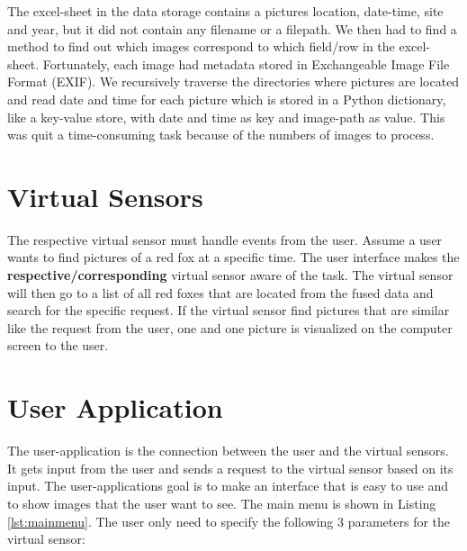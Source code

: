 \documentclass[USenglish]{uit-thesis}
\begin{document}
The excel-sheet in the data storage contains a pictures location, date-time, site and year, but it did not contain any filename or a filepath. We then had to find a method to find out which images correspond to which field/row in the excel-sheet. Fortunately, each image had metadata stored in Exchangeable Image File Format (EXIF). We recursively traverse the directories where pictures are located and read date and time for each picture which is stored in a Python dictionary, like a key-value store, with date and time as key and image-path as value. This was quit a time-consuming task because of the numbers of images to process.



\section{Virtual Sensors}
The respective virtual sensor must handle events from the user. Assume a user wants to find pictures of a red fox at a specific time.  The user interface makes the \textbf{respective/corresponding} virtual sensor aware of the task. The virtual sensor will then go to a list of all red foxes that are located from the fused data and search for the specific request. If the virtual sensor find pictures that are similar like the request from the user, one and one picture is visualized on the computer screen to the user.


\section{User Application}
The user-application is the connection between  the user and the virtual sensors. It gets input from the user and sends a request to the virtual sensor based on its input. The user-applications goal is to make an interface that is easy to use and to show images that the user want to see. The main menu is shown in Listing \ref{lst:mainmenu}.
The user only need to specify the following 3 parameters for the virtual sensor:
\end{document}
